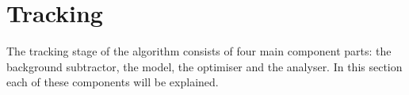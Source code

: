 
\section{Tracking}
\label{sec:tracking}

The tracking stage of the algorithm consists of four main component parts: the background subtractor, the model, the optimiser and the analyser. In this section each of these components will be explained.







